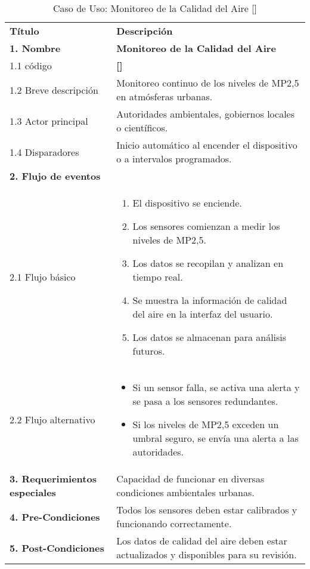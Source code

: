\documentclass[
11pt, %
codirector, %
]{charter}
\makeatletter
\newcommand{\mytwodigits}[1]{\two@digits{#1}}
\newcounter{reqCounter}
\makeatother
\begin{document}
\begin{table}[h!]
	\caption{Caso de Uso: Monitoreo de la Calidad del Aire [\CODrequerimiento\mytwodigits{\value{reqCounter}}]}
	\centering
	\begin{tabular}{ | m{4.0cm} | m{10cm} | }
		\hline
		\rowcolor{gray!50} %
		\textbf{Título} & \textbf{Descripción} \\ %
		\textbf{1. Nombre} & \textbf{Monitoreo de la Calidad del Aire} \\  
		1.1 código &\textbf{[\CODrequerimiento\mytwodigits{\value{reqCounter}}]} \\
		1.2 Breve descripción & Monitoreo continuo de los niveles de MP2,5 en atmósferas urbanas. \\
		1.3 Actor principal & Autoridades ambientales, gobiernos locales o científicos. \\
		1.4 Disparadores & Inicio automático al encender el dispositivo o a intervalos programados. \\ \hline
		\textbf{2. Flujo de eventos} &  \\
		2.1 Flujo básico & 
		\begin{enumerate}
			\item El dispositivo se enciende.
			\item Los sensores comienzan a medir los niveles de MP2,5.
			\item Los datos se recopilan y analizan en tiempo real.
			\item Se muestra la información de calidad del aire en la interfaz del usuario.
			\item Los datos se almacenan para análisis futuros.
		\end{enumerate} \\
		2.2 Flujo alternativo & 
		\begin{itemize}
			\item Si un sensor falla, se activa una alerta y se pasa a los sensores redundantes.
			\item Si los niveles de MP2,5 exceden un umbral seguro, se envía una alerta a las autoridades.
		\end{itemize} \\ \hline
		\textbf{3. Requerimientos especiales} & Capacidad de funcionar en diversas condiciones ambientales urbanas. \\ \hline
		\textbf{4. Pre-Condiciones} & Todos los sensores deben estar calibrados y funcionando correctamente. \\ \hline
		\textbf{5. Post-Condiciones} & Los datos de calidad del aire deben estar actualizados y disponibles para su revisión. \\ \hline
	\end{tabular}
	
\end{table}
\end{document}
